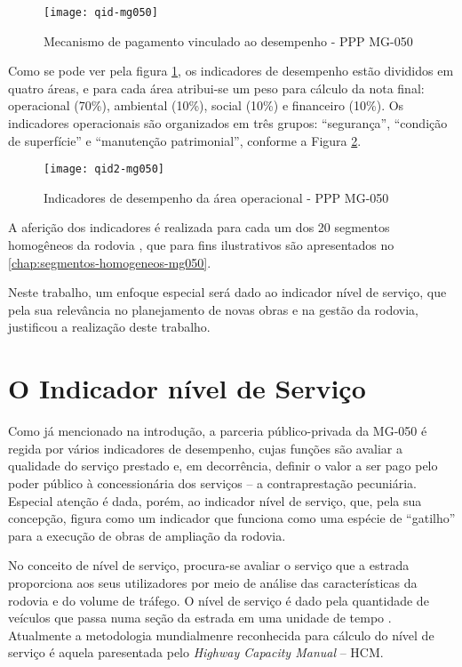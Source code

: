 \documentclass[
	12pt,				%
	openright,			%
	twoside,			%
	a4paper,			%
	english,			%
	french,				%
	spanish,			%
	brazil				%
	]{abntex2}
\begin{document}
\begin{figure}[h]
\caption{\label{fig:qid1} Mecanismo de pagamento vinculado ao desempenho - PPP MG-050}
\centering
\texttt{[image: qid-mg050]}
\end{figure}

Como se pode ver pela figura \ref{fig:qid1}, os indicadores de desempenho estão divididos em quatro áreas, e para cada área atribui-se um peso para cálculo da nota final: operacional (70\%), ambiental (10\%), social (10\%) e financeiro (10\%).
Os indicadores operacionais são organizados em três grupos: “segurança”, “condição de superfície” e “manutenção patrimonial”, conforme a Figura \ref{fig:qid2}.

\begin{figure}[h]
\caption{\label{fig:qid2} Indicadores de desempenho da área operacional - PPP MG-050}
\centering
\texttt{[image: qid2-mg050]}
\end{figure}

A aferição dos indicadores é realizada para cada um dos 20 segmentos homogêneos da rodovia , que para fins ilustrativos são apresentados no \ref{chap:segmentos-homogeneos-mg050}. 

Neste trabalho, um enfoque especial será dado ao indicador nível de serviço, que pela sua relevância no planejamento de novas obras e na gestão da rodovia, justificou a realização deste trabalho.


\section{O Indicador nível de Serviço}

Como já mencionado na introdução, a parceria público-privada da MG-050 é regida por vários indicadores de desempenho, cujas funções são avaliar a qualidade do serviço prestado e, em decorrência, definir o valor a ser pago pelo poder público à concessionária dos serviços – a contraprestação pecuniária.
Especial atenção é dada, porém, ao indicador nível de serviço, que, pela sua concepção, figura como um indicador que funciona como uma espécie de “gatilho” para a execução de obras de ampliação da rodovia.

No conceito de nível de serviço, procura-se avaliar o serviço que a estrada proporciona aos seus utilizadores por meio de análise das características da rodovia e do volume de tráfego. O nível de serviço é dado pela quantidade de veículos que passa numa seção da estrada em uma unidade de tempo \cite{santosmourao2013}. Atualmente a metodologia mundialmenre reconhecida para cálculo do nível de serviço é aquela paresentada pelo \emph{Highway Capacity Manual} – HCM.
\end{document}

